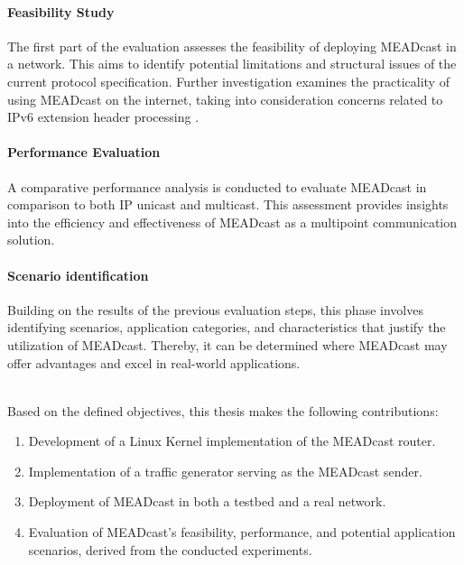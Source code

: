 \paragraph{Feasibility Study} %
\label{par:Feasibility Study}
The first part of the evaluation assesses the feasibility of deploying
    MEADcast in a network.
This aims to identify potential limitations and structural issues of the
    current protocol specification.
Further investigation examines the practicality of using MEADcast on the
    internet, taking into consideration concerns related to IPv6 extension
    header processing \cite{rfc7872_ext_hdrs_drop_rate}.

\paragraph{Performance Evaluation} %
\label{par:Performance Evaluation}
A comparative performance analysis is conducted to evaluate MEADcast in
    comparison to both IP unicast and multicast.
This assessment provides insights into the efficiency and effectiveness of
    MEADcast as a multipoint communication solution.

\paragraph{Scenario identification} %
\label{par:Scenario identification}
Building on the results of the previous evaluation steps, this phase involves
    identifying scenarios, application categories, and characteristics that
    justify the utilization of MEADcast.
Thereby, it can be determined where MEADcast may offer advantages and excel in
    real-world applications.
    
\noindent\\
Based on the defined objectives, this thesis makes the following contributions:
\begin{enumerate}[itemsep=0.3em]
    \item Development of a Linux Kernel implementation of the MEADcast router.
    \item Implementation of a traffic generator serving as the MEADcast sender.
    \item Deployment of MEADcast in both a testbed and a real network.
    \item Evaluation of MEADcast's feasibility, performance, and potential
            application scenarios, derived from the conducted experiments.
\end{enumerate}

